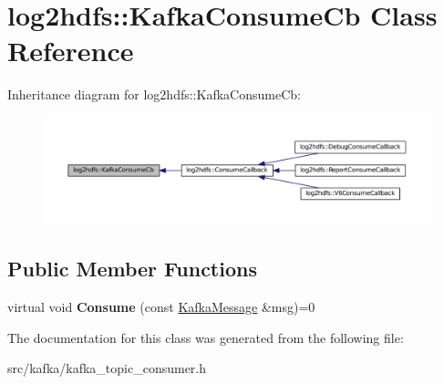 \hypertarget{classlog2hdfs_1_1KafkaConsumeCb}{}\section{log2hdfs\+:\+:Kafka\+Consume\+Cb Class Reference}
\label{classlog2hdfs_1_1KafkaConsumeCb}


Inheritance diagram for log2hdfs\+:\+:Kafka\+Consume\+Cb\+:
\nopagebreak
\begin{figure}[H]
\begin{center}
\leavevmode
\includegraphics[width=350pt]{classlog2hdfs_1_1KafkaConsumeCb__inherit__graph}
\end{center}
\end{figure}
\subsection*{Public Member Functions}
\begin{DoxyCompactItemize}
\item 
virtual void {\bfseries Consume} (const \hyperlink{classlog2hdfs_1_1KafkaMessage}{Kafka\+Message} \&msg)=0\hypertarget{classlog2hdfs_1_1KafkaConsumeCb_a4eb2387a0688e2db2167b0cba341cafa}{}\label{classlog2hdfs_1_1KafkaConsumeCb_a4eb2387a0688e2db2167b0cba341cafa}

\end{DoxyCompactItemize}


The documentation for this class was generated from the following file\+:\begin{DoxyCompactItemize}
\item 
src/kafka/kafka\+\_\+topic\+\_\+consumer.\+h\end{DoxyCompactItemize}
